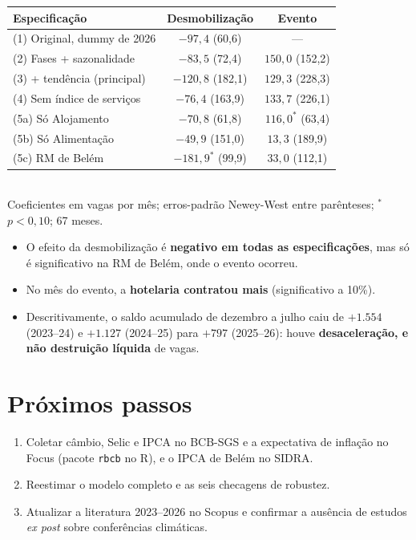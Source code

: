 \begin{table}[H]
\centering\small
\begin{tabularx}{\linewidth}{Lcc}
\toprule
\textbf{Especificação} & \textbf{Desmobilização} & \textbf{Evento}\\
\midrule
(1) Original, dummy de 2026 & $-97{,}4$ \;(60,6) & ---\\
(2) Fases + sazonalidade & $-83{,}5$ \;(72,4) & $150{,}0$ \;(152,2)\\
(3) + tendência (principal) & $-120{,}8$ \;(182,1) & $129{,}3$ \;(228,3)\\
(4) Sem índice de serviços & $-76{,}4$ \;(163,9) & $133{,}7$ \;(226,1)\\
(5a) Só Alojamento & $-70{,}8$ \;(61,8) & $116{,}0^{*}$ \;(63,4)\\
(5b) Só Alimentação & $-49{,}9$ \;(151,0) & $13{,}3$ \;(189,9)\\
(5c) RM de Belém & $-181{,}9^{*}$ \;(99,9) & $33{,}0$ \;(112,1)\\
\bottomrule
\end{tabularx}\\[3pt]
{\footnotesize Coeficientes em vagas por mês; erros-padrão Newey-West entre parênteses; $^{*}$ $p<0{,}10$; 67 meses.}
\end{table}

\begin{itemize}
  \item O efeito da desmobilização é \textbf{negativo em todas as especificações}, mas só é
        significativo na RM de Belém, onde o evento ocorreu.
  \item No mês do evento, a \textbf{hotelaria contratou mais} (significativo a 10\%).
  \item Descritivamente, o saldo acumulado de dezembro a julho caiu de $+1.554$ (2023--24) e $+1.127$
        (2024--25) para $+797$ (2025--26): houve \textbf{desaceleração, e não destruição líquida} de vagas.
\end{itemize}


\section{Próximos passos}

\begin{enumerate}[leftmargin=*]
  \item Coletar câmbio, Selic e IPCA no BCB-SGS e a expectativa de inflação no Focus (pacote
        \texttt{rbcb} no R), e o IPCA de Belém no SIDRA.
  \item Reestimar o modelo completo e as seis checagens de robustez.
  \item Atualizar a literatura 2023--2026 no Scopus e confirmar a ausência de estudos \textit{ex post}
        sobre conferências climáticas.
\end{enumerate}


